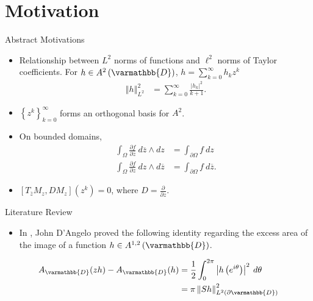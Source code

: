 \documentclass{beamer}
\newcommand{\norm}[1]{\left\Vert #1 \right\Vert}
\newcommand{\set}[1]{\left\{#1\right\}}
\renewcommand*{\mathbb}[1]{\varmathbb{#1}}
\begin{document}
\section{Motivation}
\begin{frame}{Abstract Motivations}
  \begin{itemize}
    \item Relationship between $L^{2}$ norms of functions and $\ell^{2}$ norms of Taylor coefficients. For $h\in A^{2}\left(\mathbb{D}\right)$, $h = \sum_{k=0}^{\infty}h_kz^k$
      \begin{align*}
        \norm{h}_{L^2}^2 &= \sum_{k=0}^{\infty}\frac{\left\vert h_k \right\vert^2}{k+1}.
      \end{align*}
    \item $\set{z^k}_{k=0}^{\infty}$ forms an orthogonal basis for $A^{2}$.
    \item On bounded domains,
      \begin{align*}
        \int_{\Omega}^{} \frac{\partial f}{\partial \overline{z}}\:d\overline{z}\wedge dz &= \int_{\partial \Omega}^{} f\:dz\\
        \int_{\Omega}^{} \frac{\partial f}{\partial z}\:dz\wedge d\overline{z} &= \int_{\partial \Omega}^{} f\:d\overline{z}.
      \end{align*}
    \item $\left[T_{\overline{z}}M_z,DM_{z}\right]\left(z^k\right) = 0$, where $D = \frac{\partial }{\partial z}$.
  \end{itemize}
\end{frame}
\begin{frame}{Literature Review}
  \begin{itemize}
    \item In \cite{d2019hermitian}, John D'Angelo proved the following identity regarding the excess area of the image of a function $h\in A^{1,2}\left(\mathbb{D}\right)$.
  \end{itemize}
  \begin{align*}
    A_{\mathbb{D}}(zh) - A_{\mathbb{D}}(h) &= \frac{1}{2}\int_{0}^{2\pi} \left\vert h\left(e^{i\theta}\right) \right\vert^2\:d\theta\\
                                            &= \pi \norm{Sh}_{L^{2}\left(\partial \mathbb{D}\right)}^2
  \end{align*}
\end{frame}
\end{document}
